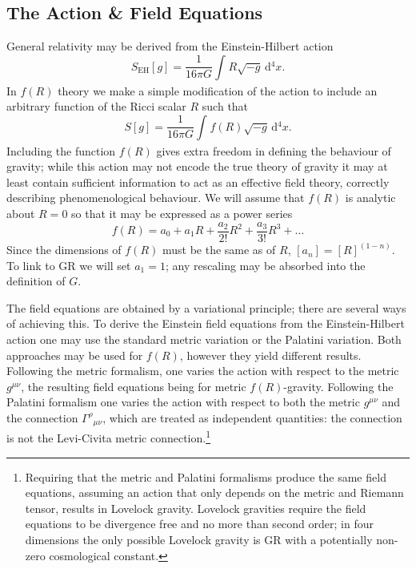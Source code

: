 \documentclass[aps,prd,reprint,showpacs]{revtex4-1}
\newcommand{\sub}[1]{\ensuremath{_\text{#1}}}
\newcommand{\dd}{\ensuremath{\text{d}}}
\newcommand{\intd}[4]{\ensuremath{\int_{#1}^{#2}{#3}\,\dd{#4}}}
\newcommand{\recip}[1]{\ensuremath{\frac{1}{#1}}}
\begin{document}
\subsection{The Action \& Field Equations\label{sec:Action}}

General relativity may be derived from the Einstein-Hilbert action\cite{Misner1973, Landau1975}
\begin{equation}
S\sub{EH}[g] = \recip{16\pi G}\intd{}{}{R\sqrt{-g}}{^4x}.
\end{equation}
In $f(R)$ theory we make a simple modification of the action to include an arbitrary function of the Ricci scalar $R$ such that\cite{Buchdahl1970}
\begin{equation}
S[g] = \recip{16\pi G}\intd{}{}{f(R)\sqrt{-g}}{^4x}.
\end{equation}
Including the function $f(R)$ gives extra freedom in defining the behaviour of gravity; while this action may not encode the true theory of gravity it may at least contain sufficient information to act as an effective field theory, correctly describing phenomenological behaviour\cite{Park2010}. We will assume that $f(R)$ is analytic about $R = 0$ so that it may be expressed as a power series\cite{Buchdahl1970, Psaltis2008}
\begin{equation}
f(R) = a_0 + a_1 R + \frac{a_2}{2!}R^2 + \frac{a_3}{3!}R^3 + \ldots
\end{equation}
Since the dimensions of $f(R)$ must be the same as of $R$, $[a_n] = [R]^{(1-n)}$. To link to GR we will set $a_1 = 1$; any rescaling may be absorbed into the definition of $G$.

The field equations are obtained by a variational principle; there are several ways of achieving this. To derive the Einstein field equations from the Einstein-Hilbert action one may use the standard metric variation or the Palatini variation\cite{Misner1973}. Both approaches may be used for $f(R)$, however they yield different results\cite{Sotiriou2010, DeFelice2010}. Following the metric formalism, one varies the action with respect to the metric $g^{\mu\nu}$, the resulting field equations being for metric $f(R)$-gravity. Following the Palatini formalism one varies the action with respect to both the metric $g^{\mu\nu}$ and the connection ${\Gamma^\rho}_{\mu\nu}$, which are treated as independent quantities: the connection is not the Levi-Civita metric connection.\footnote{Requiring that the metric and Palatini formalisms produce the same field equations, assuming an action that only depends on the metric and Riemann tensor, results in Lovelock gravity\cite{Exirifard2008}. Lovelock gravities require the field equations to be divergence free and no more than second order; in four dimensions the only possible Lovelock gravity is GR with a potentially non-zero cosmological constant\cite{Lovelock1970, Lovelock1971, Lovelock1972}.}
\end{document}
